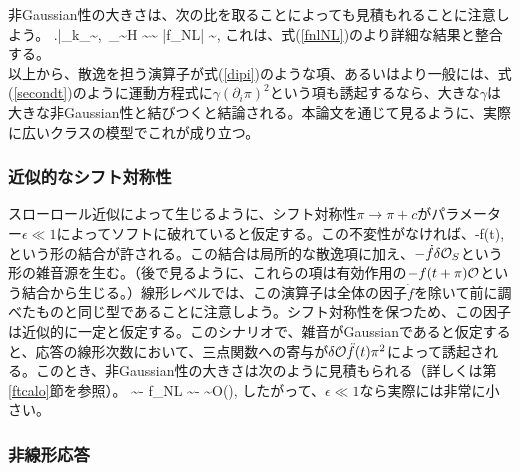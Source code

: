 非Gaussian性の大きさは、次の比を取ることによっても見積もれることに注意しよう。
\beq
\left.\right|_{k_\star\sim {},~\omega_\star \sim H} \sim {}\sim {} \zeta \to |f_{\rm NL}| \sim {},
\eeq
これは、式(\ref{fnlNL})のより詳細な結果と整合する。\\

以上から、散逸を担う演算子が式(\ref{dipi})のような項、あるいはより一般には、式(\ref{secondt})のように運動方程式に$\gamma (\partial_i \pi)^2$という項も誘起するなら、大きな$\gamma$は大きな非Gaussian性と結びつくと結論される。本論文を通じて見るように、実際に広いクラスの模型でこれが成り立つ。

\subsubsection{近似的なシフト対称性}\label{appsh}

スローロール近似によって生じるように、シフト対称性$\pi \to \pi+c$がパラメーター$\epsilon \ll 1$によってソフトに破れていると仮定する。この不変性がなければ、\beq \label{dotfdecalo}-\dot f(t)\delta\calo \pi, \eeq という形の結合が許される。この結合は局所的な散逸項に加え、$-\dot f \delta{\cal O}_S$という形の雑音源を生む。（後で見るように、これらの項は有効作用の$-f(t+\pi){\cal O}$という結合から生じる。）線形レベルでは、この演算子は全体の因子$\dot f$を除いて前に調べたものと同じ型であることに注意しよう。シフト対称性を保つため、この因子は近似的に一定と仮定する。このシナリオで、雑音がGaussianであると仮定すると、応答の線形次数において、三点関数への寄与が$\delta{\cal O} \ddot f(t) \pi^2$によって誘起される。このとき、非Gaussian性の大きさは次のように見積もられる（詳しくは第\ref{ftcalo}節を参照）。
\beq
\label{estfto}
 \sim - \zeta \to f_{\rm NL} \sim - \sim O(\epsilon),
\eeq
したがって、$\epsilon \ll 1$なら実際には非常に小さい。

\subsubsection{非線形応答}\label{nlrep}

